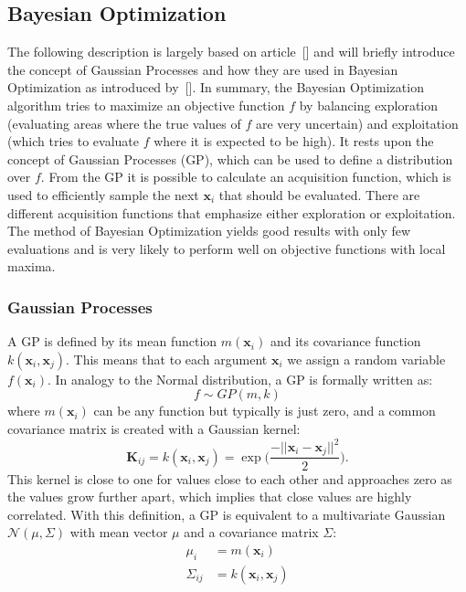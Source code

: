 \subsection{Bayesian Optimization}%

The following description is largely based on article~[\cite{brochu2010bayesopt}]
and will briefly introduce the concept of Gaussian
Processes and how they are used in Bayesian Optimization as introduced
by~[\cite{williams1996gaussian}].  In summary, the Bayesian Optimization
algorithm tries to maximize an objective function $f$ by balancing exploration
(evaluating areas where the true values of $f$ are very uncertain) and
exploitation (which tries to evaluate $f$ where it is expected to be high). It
rests upon the concept of Gaussian Processes (GP), which can be used to define
a distribution over $f$.  From the GP it is possible to calculate an
acquisition function, which is used to efficiently sample the next
$\mathbf{x}_i$ that should be evaluated.  There are different acquisition
functions that emphasize either exploration or exploitation. The method of
Bayesian Optimization yields good results with only few evaluations and is very
likely to perform well on objective functions with local maxima.\\

\subsubsection{Gaussian Processes}%
\label{ssub:gaussian_processes}

A GP is defined by its mean function $m(\mathbf{x}_i)$ and its covariance
function $k(\mathbf{x}_i, \mathbf{x}_j)$.  This means that to each argument
$\mathbf{x}_i$ we assign a random variable $f(\mathbf{x}_i)$.  In analogy to
the Normal distribution, a GP is formally written as:
\begin{equation}
  f \sim {GP}(m,k)
\end{equation}
where $m(\mathbf{x}_i)$ can be any function but typically is just zero, and a
common covariance matrix is created with a Gaussian kernel:
\begin{equation} \label{eq:cov}
  \mathbf{K}_{ij} = k(\mathbf{x}_i, \mathbf{x}_j) =
      \exp \bigg(\frac{- ||\mathbf{x}_i - \mathbf{x}_j||^2}{2}\bigg).
\end{equation}
This kernel is close to one for values close to each other and approaches zero
as the values grow further apart, which implies that close values are highly
correlated.
With this definition, a GP is equivalent to a multivariate Gaussian
$\mathcal{N}(\mu, \Sigma)$ with mean vector $\mu$ and a covariance matrix
$\Sigma$:
\begin{align}
  \mu_i &= m(\mathbf{x}_i) \\
  \Sigma_{ij} &= k(\mathbf{x}_i, \mathbf{x}_j)
\end{align}

